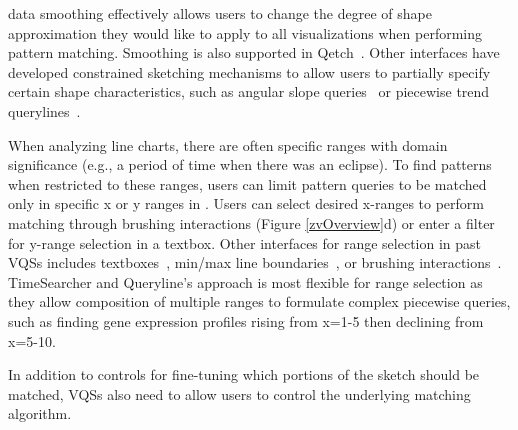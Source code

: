data smoothing effectively allows users to 
change the degree of shape approximation 
they would like to apply to all visualizations 
when performing pattern matching. 
Smoothing is also supported in Qetch~\cite{Mannino2018}. 
Other interfaces have developed constrained 
sketching mechanisms to allow users to 
partially specify certain shape characteristics, 
such as angular slope queries~\cite{Hochheiser2004} or 
piecewise trend querylines~\cite{ryall2005querylines}. 

\par When analyzing line charts,
there are often specific ranges with
domain significance (e.g., a period of time when there was an eclipse). 
To find patterns when restricted to these ranges, 
users can limit pattern queries 
to be matched only in specific x or y ranges in \zvpp. Users can select desired x-ranges 
to perform matching through brushing interactions 
(Figure \ref{zvOverview}d) 
or enter a filter for y-range selection in a textbox. 
Other interfaces for range selection in past VQSs 
includes textboxes~\cite{wattenberg2001sketching,Mannino2018}, 
min/max line boundaries~\cite{ryall2005querylines}, 
or brushing interactions~\cite{Hochheiser2001}. 
TimeSearcher and Queryline's approach is 
most flexible for range selection as 
they allow composition of multiple ranges 
to formulate complex piecewise queries, 
such as finding gene expression profiles 
rising from x=1-5 then declining from x=5-10. 
\par In addition to controls for fine-tuning
which portions of the sketch should be matched,
VQSs also need to allow users
to control the underlying matching algorithm. 
